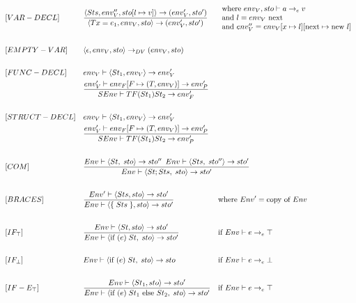 \begin{align*}
&[VAR-DECL]&&\frac{\langle Sts,env''_V, sto[l\mapsto v]\rangle\to(env'_V,sto')}{\langle T x = e_1, env_V, sto\rangle\to(env'_V,sto')}&&\begin{array}{l}
    \text{where } env_V, sto\vdash a\to_e v\\
    \text{and } l = env_V \text{ next}\\
    \text{and } env''_V = env_V[x\mapsto l][\text{next}\mapsto \text{new } l]
\end{array}\\\\
%
&[EMPTY-VAR]&&\langle\epsilon,env_V,sto\rangle\to_{DV}(env_V, sto)\\\\
%
&[FUNC-DECL]&&env_V\vdash\langle St_1, env_V\rangle\to env'_V\\
&&&\frac{env'_V\vdash env_F[F\mapsto(T,env_V)]\to env'_P}{SEnv\vdash T F(St_1) St_2\to env'_F}\\\\
%
&[STRUCT-DECL]&&env_V\vdash\langle St_1, env_V\rangle\to env'_V\\
&&&\frac{env'_V\vdash env_F[F\mapsto(T,env_V)]\to env'_P}{SEnv\vdash T F(St_1) St_2\to env'_P}\\\\
%
&[COM] & &\frac{Env \vdash \langle St, \; sto \rangle \rightarrow sto^{\prime\prime} \enskip Env \vdash \langle Sts, \; sto^{\prime\prime} \rangle \rightarrow sto^\prime}{Env \vdash \langle St; Sts, \; sto \rangle \rightarrow sto^\prime} \span \span \\\\
%
&[BRACES]&&\frac{Env^\prime\vdash\langle Sts, sto\rangle \to sto^\prime}{Env\vdash\langle\{\;Sts\;\}, sto\rangle\to sto^\prime }& & \text{where } Env^\prime = \text{copy of } Env\\\\
%
&[IF_\top] & &\frac{Env \vdash \langle St, sto \rangle \rightarrow sto^\prime}{Env \vdash \langle \text{if } (e)\; St,\; sto \rangle \rightarrow sto^\prime} & &\text{if } Env \vdash e \rightarrow_e \top\\\\
%
&[IF_\bot] & &Env \vdash \langle \text{if } (e)\; St,\; sto \rangle \rightarrow sto & &\text{if } Env \vdash e \rightarrow_e \bot\\\\
%
&[IF-E_\top] & &\frac{Env \vdash \langle St_1, sto \rangle \rightarrow sto^\prime}{Env \vdash \langle \text{if } (e)\;St_1 \text{ else } St_2,\; sto \rangle \rightarrow sto^\prime} & &\text{if } Env \vdash e \rightarrow_e \top\\\\

\end{align*}

